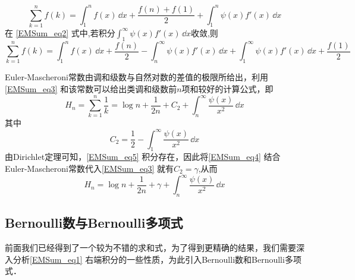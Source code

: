 \begin{equation}\label{EMSum_eq2}
    \sum_{k=1}^{n}f(k)
    =\int_{1}^{n}f(x)\,\dd x+\frac{f(n)+f(1)}{2}+\int_{1}^{n}\psi(x)f'(x)\,\dd x
\end{equation}
在 \autoref{EMSum_eq2}  式中,若积分$\displaystyle{\int_{1}^{\infty}\psi(x)f'(x)\,\dd x}$收敛,则
\begin{equation}\label{EMSum_eq3}
    \sum_{k=1}^{n}f(k)=\int_{1}^{n}f(x)\,\dd x
    +\frac{f(n)}{2}-\int_{n}^{\infty}\psi(x)f'(x)\,\dd x
    +\int_{1}^{\infty}\psi(x)f'(x)\,\dd x+\frac{f(1)}{2}
\end{equation}
\begin{example}{}
Euler-Mascheroni常数由调和级数与自然对数的差值的极限所给出，利用\autoref{EMSum_eq3} 和该常数可以给出类调和级数前$n$项和较好的计算公式，即
\begin{equation}\label{EMSum_eq4}
    H_{n}=\sum_{k=1}^{n}\frac{1}{k}=\log n+\frac{1}{2n}+C_{2}
    +\int_{n}^{\infty}\frac{\psi(x)}{x^2}\,\dd x
\end{equation}
其中
\begin{equation}\label{EMSum_eq5}
    C_{2}=\frac{1}{2}-\int_{1}^{\infty}\frac{\psi(x)}{x^2}\,\dd x
\end{equation}
由Dirichlet定理可知，\autoref{EMSum_eq5} 积分存在，因此将\autoref{EMSum_eq4} 结合
Euler-Mascheroni常数代入\autoref{EMSum_eq3} 就有$C_{2}=\gamma$,从而
\begin{equation}
    H_{n}=\log n+\frac{1}{2n}+\gamma+\int_{n}^{\infty}\frac{\psi(x)}{x^2}\,\dd x
\end{equation}
\end{example}

\subsection{Bernoulli数与Bernoulli多项式}

前面我们已经得到了一个较为不错的求和式，为了得到更精确的结果，我们需要深入分析\autoref{EMSum_eq1} 右端积分的一些性质，为此引入Bernoulli数和Bernoulli多项式．

